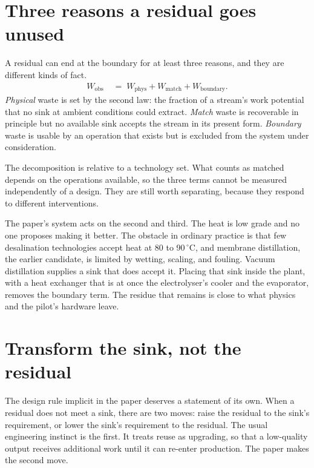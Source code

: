 \documentclass[11pt]{article}
\theoremstyle{definition}
\theoremstyle{remark}
\begin{document}
\section{Three reasons a residual goes unused}

A residual can end at the boundary for at least three reasons, and they are different kinds of fact.
\begin{align}
  W_{\mathrm{obs}} \;&=\; W_{\mathrm{phys}} + W_{\mathrm{match}} + W_{\mathrm{boundary}}.
\end{align}
\emph{Physical} waste is set by the second law: the fraction of a stream's work potential that no sink at ambient conditions could extract. \emph{Match} waste is recoverable in principle but no available sink accepts the stream in its present form. \emph{Boundary} waste is usable by an operation that exists but is excluded from the system under consideration.

The decomposition is relative to a technology set. What counts as matched depends on the operations available, so the three terms cannot be measured independently of a design. They are still worth separating, because they respond to different interventions.

The paper's system acts on the second and third. The heat is low grade and no one proposes making it better. The obstacle in ordinary practice is that few desalination technologies accept heat at 80 to 90\,$^{\circ}$C, and membrane distillation, the earlier candidate, is limited by wetting, scaling, and fouling. Vacuum distillation supplies a sink that does accept it. Placing that sink inside the plant, with a heat exchanger that is at once the electrolyser's cooler and the evaporator, removes the boundary term. The residue that remains is close to what physics and the pilot's hardware leave.

\section{Transform the sink, not the residual}

The design rule implicit in the paper deserves a statement of its own. When a residual does not meet a sink, there are two moves: raise the residual to the sink's requirement, or lower the sink's requirement to the residual. The usual engineering instinct is the first. It treats reuse as upgrading, so that a low-quality output receives additional work until it can re-enter production. The paper makes the second move.
\end{document}
